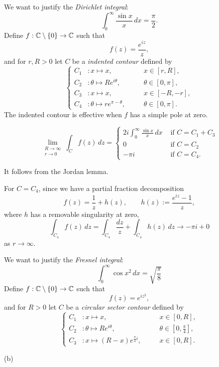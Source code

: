 \documentclass{../../large}
\begin{document}
\begin{prb}
We want to justify the \emph{Dirichlet integral}:
\[\int_0^\infty\frac{\sin x}x\,dx=\frac\pi2.\]
Define $f:\mathbb{C}\setminus\{0\}\to\mathbb{C}$ such that
\[f(z)=\frac{e^{iz}}z,\]
and for $r,R>0$ let $C$ be a \emph{indented contour} defined by
\[\left\{
\begin{alignedat}{2}
C_1&:x\mapsto x,&\quad&x\in[r,R],\\
C_2&:\theta\mapsto Re^{i\theta},&&\theta\in[0,\pi],\\
C_3&:x\mapsto x,&&x\in[-R,-r],\\
C_4&:\theta\mapsto re^{\pi-\theta},&&\theta\in[0,\pi].
\end{alignedat}
\right.\]
The indented contour is effective when $f$ has a simple pole at zero.
\begin{parts}
\item
\[\lim_{\substack{R\to\infty\\r\to0}}\int_Cf(z)\,dz=\begin{cases}
2i\int_0^\infty\frac{\sin x}x\,dx&\text{ if }C=C_1+C_3\\
0&\text{ if }C=C_2\\
-\pi i&\text{ if }C=C_4.
\end{cases}\]
\end{parts}
\end{prb}
\begin{pf}

It follows from the Jordan lemma.


For $C=C_4$, since we have a partial fraction decomposition
\[f(z)=\frac1z+h(z),\qquad h(z):=\frac{e^{iz}-1}z,\]
where $h$ has a removable singularity at zero,
\[\int_{C_4}f(z)\,dz=\int_{C_4}\frac{dz}z+\int_{C_4}h(z)\,dz\to-\pi i+0\]
as $r\to\infty$.
\end{pf}

\begin{prb}
We want to justify the \emph{Fresnel integral}:
\[\int_0^\infty\cos x^2\,dx=\sqrt{\frac\pi8}\]
Define $f:\mathbb{C}\setminus\{0\}\to\mathbb{C}$ such that
\[f(z)=e^{iz^2},\]
and for $R>0$ let $C$ be a \emph{circular sector contour} defined by
\[\left\{
\begin{alignedat}{2}
C_1&:x\mapsto x,&\quad&x\in[0,R],\\
C_2&:\theta\mapsto Re^{i\theta},&&\theta\in[0,\tfrac\pi4],\\
C_3&:x\mapsto(R-x)e^{\frac\pi4i},&&x\in[0,R].
\end{alignedat}
\right.\]
\begin{parts}
\item
\end{parts}
\end{prb}
\begin{pf}
(b)

\end{pf}
\end{document}
